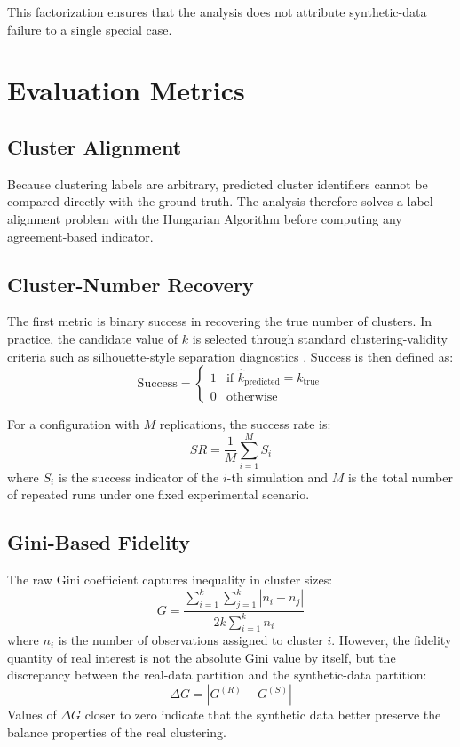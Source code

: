 This factorization ensures that the analysis does not attribute synthetic-data failure to a single special case.

\section{Evaluation Metrics}
\label{sec:evaluation-metrics}

\subsection{Cluster Alignment}
Because clustering labels are arbitrary, predicted cluster identifiers cannot be compared directly with the ground truth. The analysis therefore solves a label-alignment problem with the Hungarian Algorithm \cite{kuhn1955} before computing any agreement-based indicator.

\subsection{Cluster-Number Recovery}
The first metric is binary success in recovering the true number of clusters. In practice, the candidate value of $k$ is selected through standard clustering-validity criteria such as silhouette-style separation diagnostics \cite{rousseeuw1987}. Success is then defined as:
\begin{equation}
  \text{Success} =
  \begin{cases}
    1 & \text{if } \hat{k}_{\text{predicted}} = k_{\text{true}} \\
    0 & \text{otherwise}
  \end{cases}
\end{equation}

For a configuration with $M$ replications, the success rate is:
\begin{equation}
  SR = \frac{1}{M} \sum_{i=1}^{M} S_i
\end{equation}
where $S_i$ is the success indicator of the $i$-th simulation and $M$ is the total number of repeated runs under one fixed experimental scenario.

\subsection{Gini-Based Fidelity}
The raw Gini coefficient captures inequality in cluster sizes:
\begin{equation}
  G = \frac{\sum_{i=1}^{k} \sum_{j=1}^{k} |n_i - n_j|}{2k \sum_{i=1}^{k} n_i}
\end{equation}
where $n_i$ is the number of observations assigned to cluster $i$. However, the fidelity quantity of real interest is not the absolute Gini value by itself, but the discrepancy between the real-data partition and the synthetic-data partition:
\begin{equation}
  \Delta G = \left| G^{(R)} - G^{(S)} \right|
\end{equation}
Values of $\Delta G$ closer to zero indicate that the synthetic data better preserve the balance properties of the real clustering.

